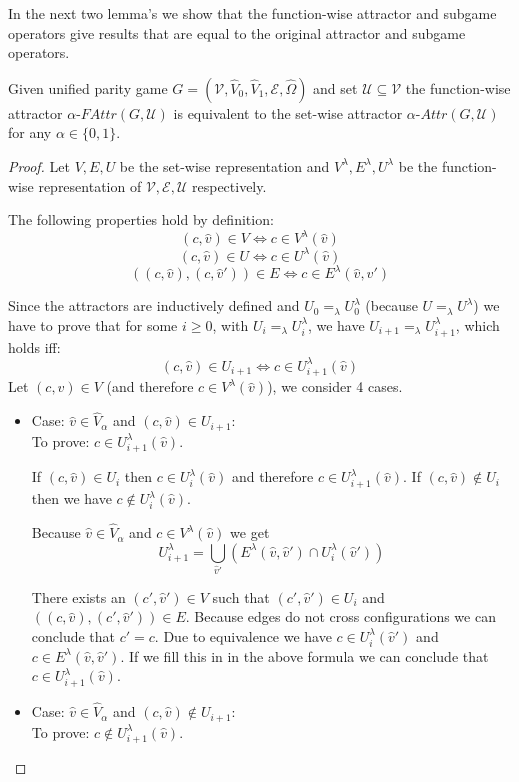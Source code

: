 In the next two lemma's we show that the function-wise attractor and subgame operators give results that are equal to the original attractor and subgame operators.
\begin{lemma}
	\label{lem_attr_equal}
	Given unified parity game $G = (\mathcal{V},\hat{V}_0,\hat{V}_1, \mathcal{E}, \hat{\Omega})$ and set $\mathcal{U} \subseteq \mathcal{V}$ the function-wise attractor $\alpha\textit{-FAttr}(G,\mathcal{U})$ is equivalent to the set-wise attractor $\alpha\textit{-Attr}(G,\mathcal{U})$ for any $\alpha \in \{0,1\}$.
	\begin{proof}
		Let $V,E,U$ be the set-wise representation and $V^\lambda,E^\lambda,U^\lambda$ be the function-wise representation of $\mathcal{V},\mathcal{E},\mathcal{U}$ respectively.
		
		The following properties hold by definition:
		\[ (c,\hat{v}) \in V \iff c \in V^\lambda(\hat{v})\]
		\[ (c,\hat{v}) \in U \iff c \in U^\lambda(\hat{v})\]
		\[ ((c,\hat{v}),(c,\hat{v}')) \in E \iff c \in E^\lambda(\hat{v},\hat{v}') \]
		
		Since the attractors are inductively defined and $U_0 =_\lambda U^\lambda_0$ (because $U =_\lambda U^\lambda$) we have to prove that for some $i \geq 0$, with $U_i =_\lambda U^\lambda_i$,  we have $U_{i+1} =_\lambda U^\lambda_{i+1}$, which holds iff:
		\[ (c,\hat{v}) \in U_{i+1} \iff c \in U^\lambda_{i+1}(\hat{v}) \]
		Let $(c,\hat{v}) \in V$ (and therefore $c \in V^\lambda(\hat{v})$), we consider 4 cases.
		\begin{itemize}
			\item Case: $\hat{v} \in \hat{V}_{\alpha}$ and $(c,\hat{v}) \in U_{i+1}$:\\
			To prove: $c \in U^\lambda_{i+1}(\hat{v})$.
			
			If $(c,\hat{v}) \in U_i$ then $c \in U^\lambda_i(\hat{v})$ and therefore $c \in U^\lambda_{i+1}(\hat{v})$. If $(c,\hat{v}) \notin U_i$ then we have $c \notin U^\lambda_i(\hat{v})$.
			
			
			Because $\hat{v} \in \hat{V}_{\alpha}$ and $c \in V^\lambda(\hat{v})$ we get
			\[ U^\lambda_{i+1} =\bigcup_{\hat{v}'} (E^\lambda(\hat{v},\hat{v}') \cap U^\lambda_i(\hat{v}')) \]
			
			There exists an $(c',\hat{v}') \in V$ such that $(c',\hat{v}') \in U_i$ and $((c,\hat{v}),(c',\hat{v}')) \in E$. Because edges do not cross configurations we can conclude that $c' = c$. Due to equivalence we have $c \in U^\lambda_i(\hat{v}')$ and $c \in E^\lambda(\hat{v},\hat{v}')$. If we fill this in in the above formula we can conclude that $c \in U^\lambda_{i+1}(\hat{v})$.
			\item Case: $\hat{v} \in \hat{V}_{\alpha}$ and $(c,\hat{v}) \notin U_{i+1}$:\\
			To prove: $c \notin U^\lambda_{i+1}(\hat{v})$.
			

\end{itemize}
\end{proof}
\end{lemma}
